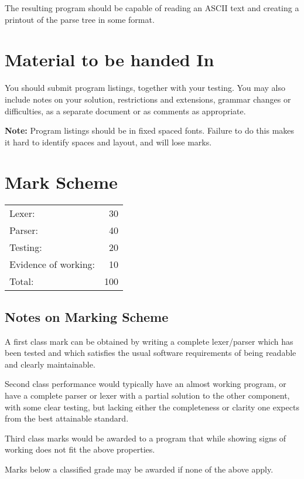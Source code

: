The resulting program should be capable of reading an ASCII text and
creating a printout of the parse tree in some format.

\section*{Material to be handed In}

You should submit program listings, together with your testing.  You
may also include notes on your solution, restrictions and extensions,
grammar changes or difficulties, as a separate document or as
comments as appropriate.

\noindent 
{\bf Note:} Program listings should be in fixed spaced fonts.  Failure
to do this makes it hard to identify spaces and layout, and will lose
marks.

\section*{Mark Scheme}

\begin{tabular}{l r}
Lexer:               &    30 \\
Parser:              &    40 \\
Testing:             &    20 \\
Evidence of working: &    10  \\
\hline
Total:               &   100
\end{tabular}

\subsection*{Notes on Marking Scheme}

A first class mark can be obtained by writing a complete lexer/parser
which has been tested and which satisfies the usual software
requirements of being readable and clearly maintainable.

Second class performance would typically have an almost working
program, or have a complete parser or lexer with a partial solution to
the other component, with some clear testing, but lacking either the
completeness or clarity one expects from the best attainable standard.

Third class marks would be awarded to a program that while showing
signs of working does not fit the above properties.

Marks below a classified grade may be awarded if none of the above apply.





